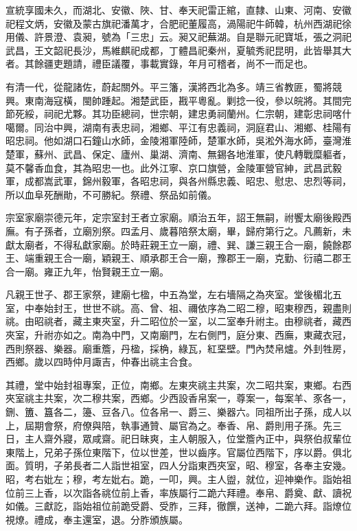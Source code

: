 \begin{pinyinscope}
宣統享國未久，而湖北、安徽、陜、甘、奉天祀雷正綰，直隸、山東、河南、安徽祀程文炳，安徽及蒙古旗祀潘萬才，合肥祀董履高，渦陽祀牛師韓，杭州西湖祀徐用儀、許景澄、袁昶，號為「三忠」云。昶又祀蕪湖。自是聯元祀寶坻，張之洞祀武昌，王文韶祀長沙，馬維麒祀成都，丁體昌祀秦州，夏毓秀祀昆明，此皆舉其大者。其餘疆吏題請，禮臣議覆，事載實錄，年月可稽者，尚不一而足也。

有清一代，從龍諸佐，蔚起關外。平三籓，漢將西北為多。靖三省教匪，蜀將競興。東南海寇橫，閩帥踵起。湘楚武臣，戡平粵亂。剿捻一役，參以皖將。其間完節死綏，祠祀尤夥。其功臣總祠，世宗朝，建忠勇祠蘭州。仁宗朝，建彰忠祠喀什噶爾。同治中興，湖南有表忠祠，湘鄉、平江有忠義祠，洞庭君山、湘鄉、桂陽有昭忠祠。他如湖口石鐘山水師，金陵湘軍陸師，楚軍水師，吳淞外海水師，臺灣淮楚軍，蘇州、武昌、保定、廬州、巢湖、濟南、無錫各地淮軍，使凡轉戰糜軀者，莫不馨香血食，其為昭忠一也。此外江寧、京口旗營，金陵軍營官紳，武昌武毅軍，成都嵩武軍，錦州毅軍，各昭忠祠，與各州縣忠義、昭忠、慰忠、忠烈等祠，所以血阜死酬勛，不可勝紀。祭禮、祭品如前儀。

宗室家廟崇德元年，定宗室封王者立家廟。順治五年，詔王無嗣，祔饗太廟後殿西廡。有子孫者，立廟別祭。四孟月、歲暮陪祭太廟，畢，歸府第行之。凡薦新，未獻太廟者，不得私獻家廟。於時莊親王立一廟，禮、巽、謙三親王合一廟，饒餘郡王、端重親王合一廟，穎親王、順承郡王合一廟，豫郡王一廟，克勤、衍禧二郡王合一廟。雍正九年，怡賢親王立一廟。

凡親王世子、郡王家祭，建廟七楹，中五為堂，左右墻隔之為夾室。堂後楣北五室，中奉始封王，世世不祧。高、曾、祖、禰依序為二昭二穆，昭東穆西，親盡則祧。由昭祧者，藏主東夾室，升二昭位於一室，以二室奉升祔主。由穆祧者，藏西夾室，升祔亦如之。南為中門，又南廟門，左右側門，庭分東、西廡，東藏衣冠，西則祭器、樂器。廟重簷，丹楹，採桷，綠瓦，紅堊壁。門內焚帛爐。外刲牲房，西鄉。歲以四時仲月諏吉，仲春出祧主合食。

其禮，堂中始封祖專案，正位，南鄉。左東夾祧主共案，次二昭共案，東鄉。右西夾室祧主共案，次二穆共案，西鄉。少西設香帛案一，尊案一，每案羊、豕各一，鉶、簠、簋各二，籩、豆各八。位各帛一、爵三、樂器六。同祖所出子孫，成人以上，屆期會祭，府僚與陪，執事通贊、屬官為之。奉香、帛、爵則用子孫。先三日，主人齋外寢，眾咸齋。祀日昧爽，主人朝服入，位堂簷內正中，與祭伯叔輩位東階上，兄弟子孫位東階下，位以世差，世以齒序。官屬位西階下，序以爵。俱北面。質明，子弟長者二人詣世祖室，四人分詣東西夾室，昭、穆室，各奉主安幾。昭，考右妣左；穆，考左妣右。跪，一叩，興。主人盥，就位，迎神樂作。詣始祖位前三上香，以次詣各祧位前上香，率族屬行二跪六拜禮。奉帛、爵奠、獻、讀祝如儀。三獻訖，詣始祖位前跪受爵、受胙，三拜，徹饌，送神，二跪六拜。詣燎位視燎。禮成，奉主還室，退。分胙頒族屬。


\end{pinyinscope}
